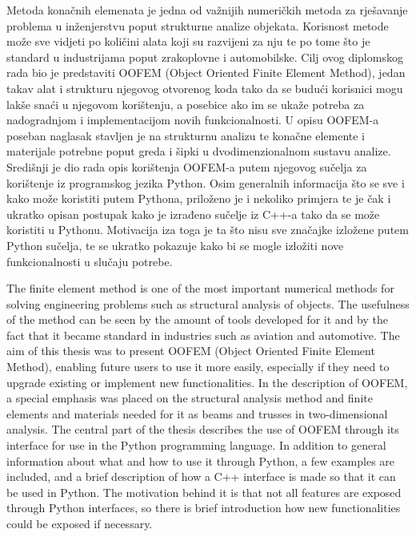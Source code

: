 \documentclass[a4paper,twoside,12pt]{memoir} %
\begin{document}
\begin{sazetak}
Metoda konačnih elemenata je jedna od važnijih numeričkih metoda za rješavanje problema u inženjerstvu poput strukturne analize objekata. Korisnost metode može sve vidjeti po količini alata koji su razvijeni za nju te po tome što je standard u industrijama poput zrakoplovne i automobilske. Cilj ovog diplomskog rada bio je predstaviti OOFEM (Object Oriented Finite Element Method), jedan takav alat i strukturu njegovog otvorenog koda tako da se budući korisnici mogu lakše snaći u njegovom korištenju, a posebice ako im se ukaže potreba za nadogradnjom i implementacijom novih funkcionalnosti. U opisu OOFEM-a poseban naglasak stavljen je na strukturnu analizu te konačne elemente i materijale potrebne poput greda i šipki u dvodimenzionalnom sustavu analize. Središnji je dio rada opis korištenja OOFEM-a putem njegovog sučelja za korištenje iz programskog jezika Python.
Osim generalnih informacija što se sve i kako može koristiti putem Pythona, priloženo je i nekoliko primjera te je čak i ukratko opisan postupak kako je izrađeno sučelje iz C++-a tako da se može koristiti u Pythonu. Motivacija iza toga je ta što nisu sve značajke izložene putem Python sučelja, te se ukratko pokazuje kako bi se mogle izložiti nove funkcionalnosti u slučaju potrebe.
\end{sazetak}

\begin{summary}
The finite element method is one of the most important numerical methods for solving engineering problems such as structural analysis of objects. The usefulness of the method can be seen by the amount of tools developed for it and by the fact that it became standard in industries such as aviation and automotive. The aim of this thesis was to present OOFEM (Object Oriented Finite Element Method), enabling future users to use it more easily, especially if they need to upgrade existing or implement new functionalities. In the description of OOFEM, a special emphasis was placed on the structural analysis method and finite elements and materials needed for it as beams and trusses in two-dimensional analysis. The central part of the thesis describes the use of OOFEM through its interface for use in the Python programming language. In addition to general information about what and how to use it through Python, a few examples are included, and a brief description of how a C++ interface is made so that it can be used in Python. The motivation behind it is that not all features are exposed through Python interfaces, so there is brief introduction how new functionalities could be exposed if necessary.
\end{summary}
\end{document}
